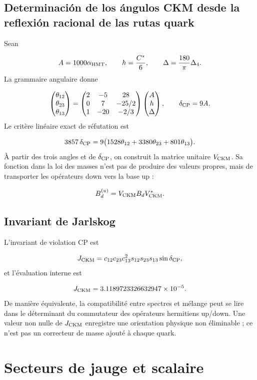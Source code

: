 \subsection{Determinación de los ángulos CKM desde la reflexión racional de las rutas quark}
Sean

\[
 A=1000\alpha_{\rm HMT},\qquad
 h=\frac{C^*}{6},\qquad
 \Delta=\frac{180}{\pi}\Delta_4.
\]
La grammaire angulaire donne

\[
 \begin{pmatrix}
 \theta_{12}\\
 \theta_{23}\\
 \theta_{13}
 \end{pmatrix}
 =
 \begin{pmatrix}
 2&-5&28\\
 0&7&-25/2\\
 1&-20&-2/3
 \end{pmatrix}
 \begin{pmatrix}
 A\\h\\\Delta
 \end{pmatrix},
\qquad
 \delta_{\rm CP}=9A.
\]
Le critère linéaire exact de réfutation est

\[
 3857\,\delta_{\rm CP}
 =9\bigl(
 1528\theta_{12}
 +3380\theta_{23}
 +801\theta_{13}
 \bigr).
\]
À partir des trois angles et de \(\delta_{\rm CP}\), on construit la matrice unitaire \(V_{\rm CKM}\). Sa fonction dans la loi des masses n'est pas de produire des valeurs propres, mais de transporter les opérateurs down vers la base up :

\[
 B_d^{(u)}=V_{\rm CKM}B_dV_{\rm CKM}^*.
\]
\subsection{Invariant de Jarlskog}
L'invariant de violation CP est

\[
 J_{\rm CKM}
 =c_{12}c_{23}c_{13}^2
 s_{12}s_{23}s_{13}\sin\delta_{\rm CP},
\]
et l'évaluation interne est

\[
 J_{\rm CKM}
 =3.1189723326632947\times10^{-5}.
\]
De manière équivalente, la compatibilité entre spectres et mélange peut se lire dans le déterminant du commutateur des opérateurs hermitiens up/down. Une valeur non nulle de \(J_{\rm CKM}\) enregistre une orientation physique non éliminable ; ce n'est pas un correcteur de masse ajouté à chaque quark.

\section{Secteurs de jauge et scalaire}
